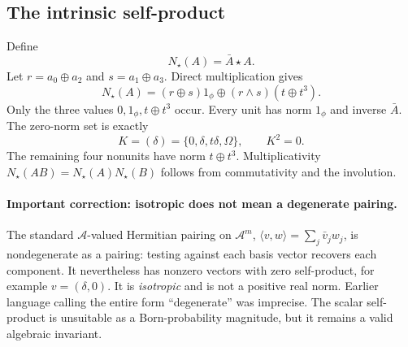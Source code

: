 \documentclass[11pt,a4paper]{article}
\theoremstyle{definition}\newtheorem{definition}[theorem]{Definition}
\theoremstyle{remark}\newtheorem{remark}[theorem]{Remark}
\newcommand{\alg}{\mathcal A}
\newcommand{\one}{1_{\phi}}
\numberwithin{equation}{section}
\begin{document}
\subsection{The intrinsic self-product}
Define
\begin{equation}
 N_\star(A)=\bar A\star A.
\end{equation}
Let $r=a_0\oplus a_2$ and $s=a_1\oplus a_3$. Direct multiplication gives
\begin{equation}\label{eq:normformula}
 N_\star(A)=(r\oplus s)\one\oplus (r\land s)(t\oplus t^3).
\end{equation}
Only the three values $0,\one,t\oplus t^3$ occur. Every unit has norm $\one$ and inverse $\bar A$. The zero-norm set is exactly
\begin{equation}\label{eq:K}
 K=(\delta)=\{0,\delta,t\delta,\Omega\},\qquad K^2=0.
\end{equation}
The remaining four nonunits have norm $t\oplus t^3$. Multiplicativity $N_\star(AB)=N_\star(A)N_\star(B)$ follows from commutativity and the involution.

\paragraph{Important correction: isotropic does not mean a degenerate pairing.}
The standard $\alg$-valued Hermitian pairing on $\alg^m$,
$\langle v,w\rangle=\sum_j\bar v_jw_j$, is nondegenerate as a pairing: testing against each basis vector recovers each component. It nevertheless has nonzero vectors with zero self-product, for example $v=(\delta,0)$. It is \emph{isotropic} and is not a positive real norm. Earlier language calling the entire form ``degenerate'' was imprecise. The scalar self-product is unsuitable as a Born-probability magnitude, but it remains a valid algebraic invariant.
\end{document}
